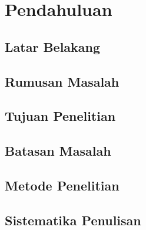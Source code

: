 \chapter{Pendahuluan}
\label{chap:pendahuluan}

\section{Latar Belakang}
\label{sec:latar_belakang}

\section{Rumusan Masalah}
\label{sec:rumusan_masalah}

\section{Tujuan Penelitian}
\label{sec:tujuan}

\section{Batasan Masalah}
\label{sec:batasan_masalah}

\section{Metode Penelitian}
\label{sec:metode_penelitian}

\section{Sistematika Penulisan}
\label{sec:sistematika}
